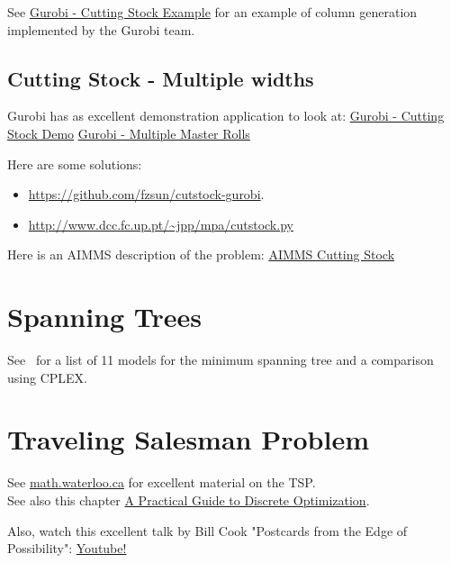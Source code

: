 See \href{https://github.com/Gurobi/modeling-examples/blob/master/colgen-cutting_stock/colgen-cutting_stock.ipynb}{Gurobi - Cutting Stock Example} for an example of column generation implemented by the Gurobi team.

\subsection{Cutting Stock - Multiple widths}
\begin{resource}
Gurobi has as excellent demonstration application to look at:
\href{https://demos.gurobi.com/cutstock/}{Gurobi - Cutting Stock Demo}
\href{https://www.gurobi.com/cutting-stock-problem-with-multiple-master-rolls/}{Gurobi - Multiple Master Rolls}
\end{resource}


Here are some solutions:
\begin{itemize}
\item  \url{https://github.com/fzsun/cutstock-gurobi}.
\item \url{http://www.dcc.fc.up.pt/~jpp/mpa/cutstock.py}
\end{itemize}


Here is an AIMMS description of the problem: 
\href{https://download.aimms.com/aimms/download/manuals/AIMMS3OM_CuttingStock.pdf}{AIMMS Cutting Stock}



\section{Spanning Trees}
\label{sec:spanning-tree-models}

%
%
%
%
\begin{resource}
See~\cite{Abdelmaguid2018} for a list of 11 models for the minimum spanning tree and a comparison using CPLEX.
\end{resource}

\section{Traveling Salesman Problem}
\label{sec:tsp-models}
\begin{resource}
See \href{http://www.math.uwaterloo.ca/tsp/index.html}{math.waterloo.ca} for excellent material on the TSP.\\
See also this chapter \href{https://www.math.uwaterloo.ca/~bico/papers/comp_chapter1.pdf}{A Practical Guide to Discrete
Optimization}.

Also, watch this excellent talk by Bill Cook "Postcards from the Edge of Possibility":
\href{https://m.youtube.com/watch?v=5VjphFYQKj8}{Youtube!}
\end{resource}


